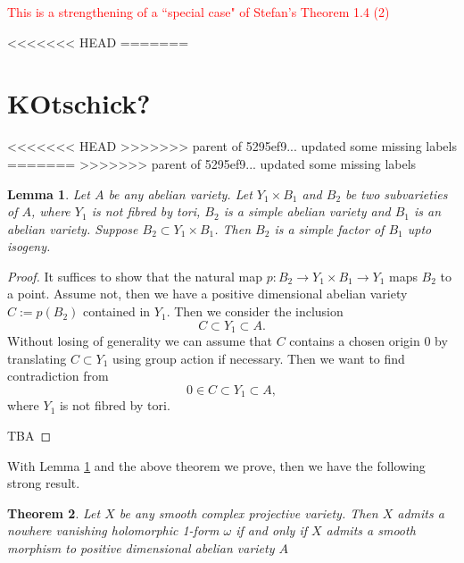 \documentclass[a4paper,12pt,reqno]{amsart}
\newtheorem{theorem}{Theorem}[section]
\theoremstyle{plain}
\newtheorem{lemma}[theorem]{Lemma}
\theoremstyle{remark}
\newcommand{\sorry}[1]{\textcolor{red}{#1}}
\begin{document}
\sorry{This is a strengthening of a ``special case" of Stefan's Theorem 1.4 (2)}

<<<<<<< HEAD
=======





\section{KOtschick?}
<<<<<<< HEAD
>>>>>>> parent of 5295ef9... updated some missing labels
=======
>>>>>>> parent of 5295ef9... updated some missing labels
\begin{lemma}\label{Lem:inclusion-fiber-by-tori}
Let $A$ be any abelian variety. Let $Y_1\times B_1$ and $B_2$ be two subvarieties of $A$, where $Y_1$ is not fibred by tori, $B_2$ is a simple abelian variety and $B_1$ is an abelian variety. Suppose $B_2\subset Y_1\times B_1$. Then $B_2$ is a simple factor of $B_1$ upto isogeny.
\end{lemma}

\begin{proof}
It suffices to show that the natural map $p: B_2\to Y_1\times B_1\to Y_1$ maps $B_2$ to a point. Assume not, then we have a positive dimensional abelian variety $C:=p(B_2)$ contained in $Y_1$. Then we consider the inclusion $$C\subset Y_1\subset A.$$ Without losing of generality we can assume that $C$ contains a chosen origin $0$ by translating $C\subset Y_1$ using group action if necessary. Then we want to find contradiction from  $$0\in C\subset Y_1\subset A,$$ where $Y_1$ is not fibred by tori.

TBA
\end{proof}

With Lemma \ref{Lem:inclusion-fiber-by-tori} and the above theorem we prove, then we have the following strong result.

\begin{theorem}
Let $X$ be any smooth complex projective variety. Then $X$ admits a nowhere vanishing holomorphic 1-form $\omega$ if and only if $X$ admits a smooth morphism to positive dimensional abelian variety $A$
\end{theorem}
\end{document}
